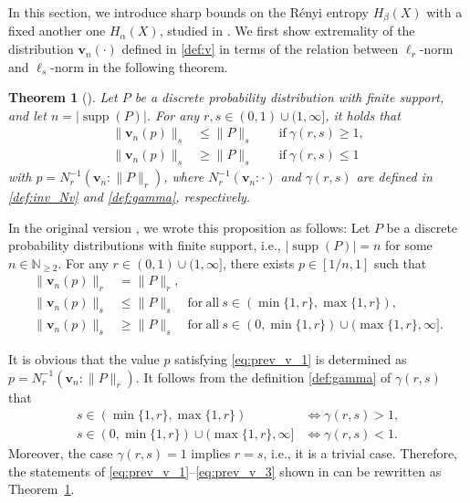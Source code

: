 \documentclass[conference, draftcls, onecolumn]{IEEEtran}
\theoremstyle{plain}
\newtheorem{theorem}{Theorem}
\newcommand{\bvec}[1]{\boldsymbol{#1}}
\newcommand{\supp}{\operatorname{supp}}
\newcommand{\thref}[1]{Theorem~\ref{#1}}
\begin{document}
In this section, we introduce sharp bounds on the R\'{e}nyi entropy $H_{\beta}( X )$ with a fixed another one $H_{\alpha}( X )$, studied in \cite{itw2016_reject}.
We first show extremality of the distribution $\bvec{v}_{n}( \cdot )$ defined in \eqref{def:v} in terms of the relation between $\ell_{r}$-norm and $\ell_{s}$-norm in the following theorem.



\begin{theorem}[{\cite[Lemma~2]{itw2016_reject}}]
\label{th:v}
Let $P$ be a discrete probability distribution with finite support, and let $n = |\! \supp(P)|$.
For any $r, s \in (0, 1) \cup (1, \infty]$, it holds that
\begin{align}
\| \bvec{v}_{n}( p ) \|_{s}
& \le
\| P \|_{s}
\qquad \mathrm{if} \ \gamma( r, s ) \ge 1 ,
\label{eq:bound_v_1} \\
\| \bvec{v}_{n}( p ) \|_{s}
& \ge
\| P \|_{s}
\qquad \mathrm{if} \ \gamma( r, s ) \le 1
\label{eq:bound_v_2}
\end{align}
with $p = N_{r}^{-1}( \bvec{v}_{n} : \| P \|_{r} )$, where $N_{r}^{-1}( \bvec{v}_{n} : \cdot )$ and $\gamma( r, s )$ are defined in \eqref{def:inv_Nv} and \eqref{def:gamma}, respectively.
\end{theorem}



\begin{IEEEproof}[Proof of \thref{th:v}]
In the original version \cite[Lemma~2]{itw2016_reject}, we wrote this proposition as follows:
Let $P$ be a discrete probability distributions with finite support, i.e., $|\!\supp( P )| = n$ for some $n \in \mathbb{N}_{\ge 2}$.
For any $r \in (0, 1) \cup (1, \infty]$, there exists $p \in [1/n, 1]$ such that
\begin{align}
\| \bvec{v}_{n}( p ) \|_{r}
& =
\| P \|_{r} ,
\label{eq:prev_v_1} \\
\| \bvec{v}_{n}( p ) \|_{s}
& \le
\| P \|_{s}
\quad \mathrm{for} \ \mathrm{all} \ s \in (\min\{ 1, r \}, \max\{ 1, r \}) ,
\label{eq:prev_v_2} \\
\| \bvec{v}_{n}( p ) \|_{s}
& \ge
\| P \|_{s}
\quad \mathrm{for} \ \mathrm{all} \ s \in (0, \min\{ 1, r \}) \cup (\max\{ 1, r \}, \infty] .
\label{eq:prev_v_3} 
\end{align}

It is obvious that the value $p$ satisfying \eqref{eq:prev_v_1} is determined as $p = N_{r}^{-1}( \bvec{v}_{n} : \| P \|_{r} )$.
It follows from the definition \eqref{def:gamma} of $\gamma( r, s )$ that
\begin{align}
s \in (\min\{ 1, r \}, \max\{ 1, r \})
& \iff
\gamma( r, s ) > 1 ,
\\
s \in (0, \min\{ 1, r \}) \cup (\max\{ 1, r \}, \infty]
& \iff
\gamma( r, s ) < 1 .
\end{align}
Moreover, the case $\gamma( r, s ) = 1$ implies $r = s$, i.e., it is a trivial case.
Therefore, the statements of \eqref{eq:prev_v_1}--\eqref{eq:prev_v_3} shown in \cite[Lemma~2]{itw2016_reject} can be rewritten as \thref{th:v}.
\end{IEEEproof}
\end{document}
